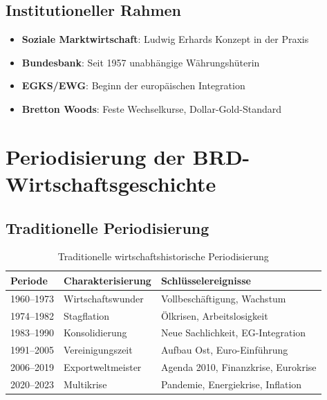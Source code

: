 \subsection{Institutioneller Rahmen}
\begin{itemize}
\item \textbf{Soziale Marktwirtschaft}: Ludwig Erhards Konzept in der Praxis
\item \textbf{Bundesbank}: Seit 1957 unabhängige Währungshüterin
\item \textbf{EGKS/EWG}: Beginn der europäischen Integration
\item \textbf{Bretton Woods}: Feste Wechselkurse, Dollar-Gold-Standard
\end{itemize}

\section{Periodisierung der BRD-Wirtschaftsgeschichte}

\subsection{Traditionelle Periodisierung}
\begin{table}[ht]
\centering
\begin{tabular}{lll}
\toprule
\textbf{Periode} & \textbf{Charakterisierung} & \textbf{Schlüsselereignisse} \\
\midrule
1960--1973 & Wirtschaftswunder & Vollbeschäftigung, Wachstum \\
1974--1982 & Stagflation & Ölkrisen, Arbeitslosigkeit \\
1983--1990 & Konsolidierung & Neue Sachlichkeit, EG-Integration \\
1991--2005 & Vereinigungszeit & Aufbau Ost, Euro-Einführung \\
2006--2019 & Exportweltmeister & Agenda 2010, Finanzkrise, Eurokrise \\
2020--2023 & Multikrise & Pandemie, Energiekrise, Inflation \\
\bottomrule
\end{tabular}
\caption{Traditionelle wirtschaftshistorische Periodisierung}
\label{tab:periodisierung-traditionell}
\end{table}

